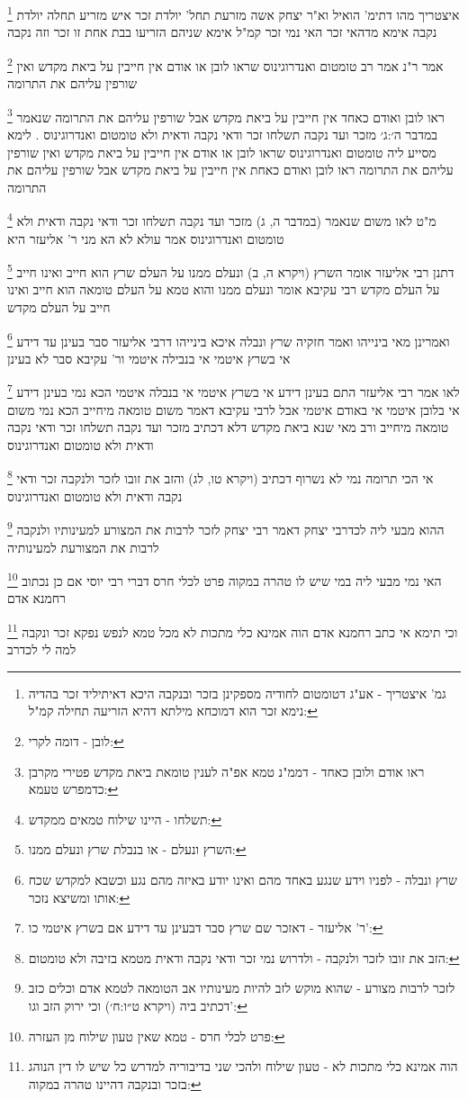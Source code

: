 \documentclass[12pt, openany]{book}
\newcommand{\footnotecomment}[1]{
	\renewcommand\thefootnote{}
	\footnote{#1}}
\newcommand{\commenta}[1]{\footnotecomment{#1}}
\begin{document}
{\commenta{גמ' איצטריך - אע"ג דטומטום לחודיה מספקינן בזכר ובנקבה היכא דאיתיליד זכר בהדיה נימא זכר הוא דמוכחא מילתא דהיא הזריעה תחילה קמ"ל:}
איצטריך מהו דתימ' הואיל וא"ר יצחק אשה מזרעת תחל' יולדת זכר איש מזריע תחלה יולדת נקבה אימא מדהאי זכר האי נמי זכר קמ"ל אימא שניהם הזריעו בבת אחת זו זכר וזה נקבה 
\commenta{לובן - דומה לקרי:}
אמר ר"נ אמר רב טומטום ואנדרוגינוס שראו לובן או אודם אין חייבין על ביאת מקדש ואין שורפין עליהם את התרומה 
\commenta{ראו אודם ולובן כאחד - דממ"נ טמא אפ"ה לענין טומאת ביאת מקדש פטירי מקרבן כדמפרש טעמא:}
ראו לובן ואודם כאחד אין חייבין על ביאת מקדש אבל שורפין עליהם את התרומה שנאמר {במדבר ה׳:ג׳ } מזכר ועד נקבה
תשלחו זכר ודאי נקבה ודאית ולא טומטום ואנדרוגינוס .
לימא מסייע ליה טומטום ואנדרוגינוס שראו לובן או אודם אין חייבין על ביאת מקדש ואין שורפין עליהם את התרומה ראו לובן ואודם כאחת אין חייבין על ביאת מקדש אבל שורפין עליהם את התרומה 
\commenta{תשלחו - היינו שילוח טמאים ממקדש:}
מ"ט לאו משום שנאמר (במדבר ה, ג) מזכר ועד נקבה תשלחו זכר ודאי נקבה ודאית ולא טומטום ואנדרוגינוס אמר עולא לא הא מני ר' אליעזר היא 
\commenta{השרץ ונעלם - או בנבלת שרץ ונעלם ממנו:}
דתנן רבי אליעזר אומר השרץ (ויקרא ה, ב) ונעלם ממנו על העלם שרץ הוא חייב ואינו חייב על העלם מקדש 
רבי עקיבא אומר ונעלם ממנו והוא טמא על העלם טומאה הוא חייב ואינו חייב על העלם מקדש 
\commenta{שרץ ונבלה - לפניו וידע שנגע באחד מהם ואינו יודע באיזה מהם נגע וכשבא למקדש שכח אותו ומשיצא נזכר:}
ואמרינן מאי בינייהו ואמר חזקיה שרץ ונבלה איכא בינייהו דרבי אליעזר סבר בעינן עד דידע אי בשרץ איטמי אי בנבילה איטמי ור' עקיבא סבר לא בעינן 
\commenta{ר' אליעזר - דאזכר שם שרץ סבר דבעינן עד דידע אם בשרץ איטמי כו':}
לאו אמר רבי אליעזר התם בעינן דידע אי בשרץ איטמי אי בנבלה איטמי הכא נמי בעינן דידע אי בלובן איטמי אי באודם איטמי 
אבל לרבי עקיבא דאמר משום טומאה מיחייב הכא נמי משום טומאה מיחייב 
ורב מאי שנא ביאת מקדש דלא דכתיב מזכר ועד נקבה תשלחו זכר ודאי נקבה ודאית ולא טומטום ואנדרוגינוס 
\commenta{הזב את זובו לזכר ולנקבה - ולדרוש נמי זכר ודאי נקבה ודאית מטמא בזיבה ולא טומטום:}
אי הכי תרומה נמי לא נשרוף דכתיב (ויקרא טו, לג) והזב את זובו לזכר ולנקבה זכר ודאי נקבה ודאית ולא טומטום ואנדרוגינוס 
\commenta{לזכר לרבות מצורע - שהוא מוקש לזב להיות מעינותיו אב הטומאה לטמא אדם וכלים כזב דכתיב ביה (ויקרא ט״ו:ח׳) וכי ירוק הזב וגו':}
ההוא מבעי ליה לכדרבי יצחק דאמר רבי יצחק לזכר לרבות את המצורע למעינותיו ולנקבה לרבות את המצורעת למעינותיה 
\commenta{פרט לכלי חרס - טמא שאין טעון שילוח מן העזרה:}
האי נמי מבעי ליה במי שיש לו טהרה במקוה פרט לכלי חרס דברי רבי יוסי 
אם כן נכתוב רחמנא אדם
\commenta{הוה אמינא כלי מתכות לא - טעון שילוח ולהכי שני בדיבוריה למדרש כל שיש לו דין הנוהג בזכר ובנקבה דהיינו טהרה במקוה:}
וכי תימא אי כתב רחמנא אדם הוה אמינא כלי מתכות לא מכל טמא לנפש נפקא זכר ונקבה למה לי לכדרב 
}
\end{document}
